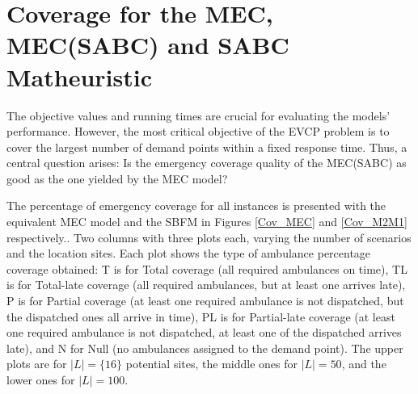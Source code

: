 \section{Coverage for the MEC, MEC(SABC) and SABC Matheuristic}

 The objective values and running times are crucial for evaluating the models' per\-for\-mance. However, the most critical objective of the EVCP problem is to cover the largest number of demand points within a fixed response time. Thus, a central question arises: Is the emergency coverage quality of the MEC(SABC) as good as the one yielded by the MEC model?  
 
The percentage of emergency coverage for all instances is presented with the equivalent MEC model and the SBFM in Figures \ref{Cov_MEC} and \ref{Cov_M2M1} respectively.. Two columns with three plots each, varying the number of scenarios and the location sites. Each plot shows the type of ambulance percentage coverage obtained: T is for Total coverage (all required ambulances on time), TL is for Total-late coverage (all required ambulances, but at least one arrives late), P is for Partial coverage (at least one required ambulance is not dispatched, but the dispatched ones all arrive in time), PL is for Partial-late coverage (at least one required ambulance is not dispatched, at least one of the dispatched arrives late), and N for Null (no ambulances assigned to the demand point). The upper plots are for  $|L|=\{16\}$ potential sites, the middle ones for $|L|=50$, and the lower ones for $|L|=100$.

